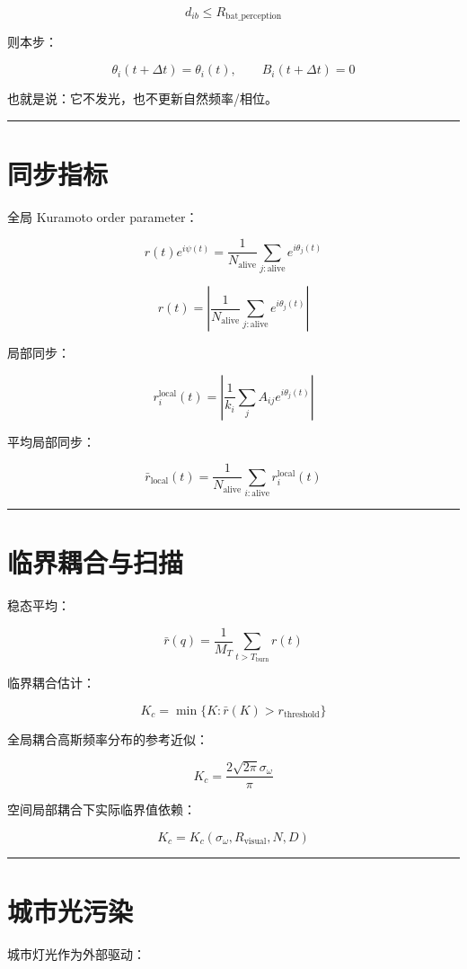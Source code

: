 \documentclass[UTF8]{ctexart}
\begin{document}
\[
d_{ib}\le R_{\text{bat\_perception}}
\]

则本步：

\[
\theta_i(t+\Delta t)=\theta_i(t),
\qquad
B_i(t+\Delta t)=0
\]

也就是说：它不发光，也不更新自然频率/相位。

\bigskip
\hrule
\bigskip

\section{同步指标}

全局 Kuramoto order parameter：

\[
r(t)e^{i\psi(t)}
=
\frac{1}{N_{\text{alive}}}
\sum_{j:\text{alive}} e^{i\theta_j(t)}
\]

\[
r(t)
=
\left|
\frac{1}{N_{\text{alive}}}
\sum_{j:\text{alive}} e^{i\theta_j(t)}
\right|
\]

局部同步：

\[
r_i^{\text{local}}(t)
=
\left|
\frac{1}{k_i}
\sum_j A_{ij}e^{i\theta_j(t)}
\right|
\]

平均局部同步：

\[
\bar r_{\text{local}}(t)
=
\frac{1}{N_{\text{alive}}}
\sum_{i:\text{alive}} r_i^{\text{local}}(t)
\]

\bigskip
\hrule
\bigskip

\section{临界耦合与扫描}

稳态平均：

\[
\bar r(q)=
\frac{1}{M_T}
\sum_{t>T_{\text{burn}}}
r(t)
\]

临界耦合估计：

\[
K_c=\min\{K:\bar r(K)>r_{\text{threshold}}\}
\]

全局耦合高斯频率分布的参考近似：

\[
K_c=
\frac{2\sqrt{2\pi}\sigma_\omega}{\pi}
\]

空间局部耦合下实际临界值依赖：

\[
K_c=K_c(\sigma_\omega,R_{\text{visual}},N,D)
\]

\bigskip
\hrule
\bigskip

\section{城市光污染}

城市灯光作为外部驱动：
\end{document}
